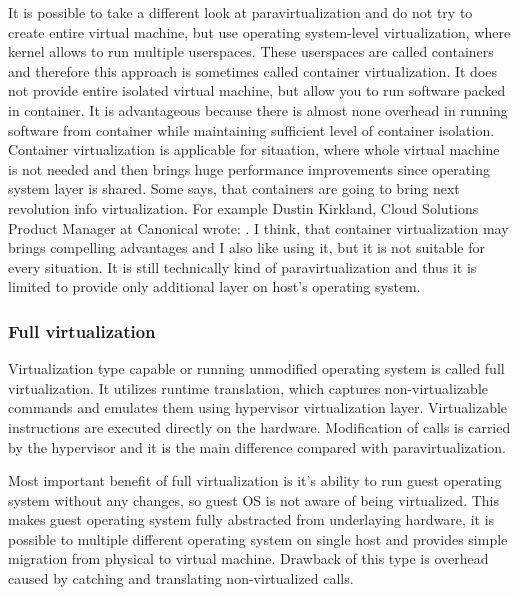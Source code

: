 It is possible to take a different look at paravirtualization and do not try to create entire virtual machine, but use operating system-level virtualization, where kernel allows to run multiple userspaces. These userspaces are called containers and therefore this approach is sometimes called container virtualization. It does not provide entire isolated virtual machine, but allow you to run software packed in container. It is advantageous because there is almost none overhead in running software from container while maintaining sufficient level of container isolation. Container virtualization is applicable for situation, where whole virtual machine is not needed and then brings huge performance improvements since operating system layer is shared. Some says, that containers are going to bring next revolution info virtualization. For example Dustin Kirkland, Cloud Solutions Product Manager at Canonical wrote:  \cite{ubuntu-docker}. I think, that container virtualization may brings compelling advantages and I also like using it, but it is not suitable for every situation. It is still technically kind of paravirtualization and thus it is limited to provide only additional layer on host's operating system.

\subsubsection{Full virtualization}
Virtualization type capable or running unmodified operating system is called full virtualization. It utilizes runtime translation, which captures non-virtualizable commands and emulates them using hypervisor virtualization layer. Virtualizable instructions are executed directly on the hardware. Modification of  calls is carried by the hypervisor and it is the main difference compared with paravirtualization. 

Most important benefit of full virtualization is it's ability to run guest operating system without any changes, so guest \Ac{OS} is not aware of being virtualized. This makes guest operating system fully abstracted from underlaying hardware, it is possible to multiple different operating system on single host and provides simple migration from physical to virtual machine. Drawback of this type is overhead caused by catching and translating non-virtualized calls. 

